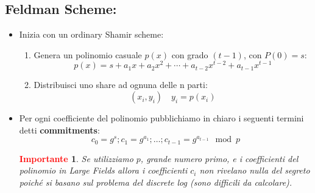 \documentclass{book}
\newtheorem*{Importante}{\textbf{\textcolor{red}{Importante}}}
\begin{document}
\subsection{Feldman Scheme:\@dealer}
\begin{itemize}
	\item Inizia con un ordinary Shamir scheme:\begin{enumerate}
		      \item Genera un polinomio casuale \(p(x)\) con grado \((t-1)\), con \(P(0)=s\):
		            \begin{equation*}
			            p(x)=s+a_{1}x+a_{2}x^{2}+\cdots+a_{t-2}x^{t-2}+a_{t-1}x^{t-1}
		            \end{equation*}
		      \item Distribuisci uno share ad ognuna delle n parti:\begin{equation*}
			            (x_{i},y_{i})\quad y_{i}=p(x_{i})
		            \end{equation*}
	      \end{enumerate}
	\item Per ogni coefficiente del polinomio pubblichiamo in chiaro i seguenti termini detti \textbf{commitments}:\begin{equation*}
		      c_{0}=g^{s};c_{1}=g^{a_{1}};\ldots;c_{t-1}=g^{a_{t-1}}\mod{p}
	      \end{equation*}
	      \begin{Importante}
		      Se utilizziamo \(p\), grande numero primo, e i coefficienti del polinomio in \emph{Large Fields} allora i coefficienti \(c_{i}\) non rivelano nulla del segreto poiché si basano sul problema del discrete log (sono difficili da calcolare).
	      \end{Importante}
\end{itemize}
\end{document}
